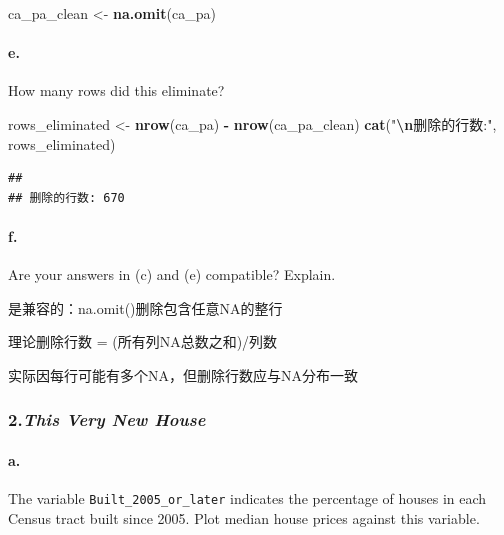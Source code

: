 \documentclass[
]{article}
\newenvironment{Shaded}{\begin{snugshade}}{\end{snugshade}}
\newcommand{\FunctionTok}[1]{\textcolor[rgb]{0.13,0.29,0.53}{\textbf{#1}}}
\newcommand{\NormalTok}[1]{#1}
\newcommand{\OtherTok}[1]{\textcolor[rgb]{0.56,0.35,0.01}{#1}}
\newcommand{\SpecialCharTok}[1]{\textcolor[rgb]{0.81,0.36,0.00}{\textbf{#1}}}
\newcommand{\StringTok}[1]{\textcolor[rgb]{0.31,0.60,0.02}{#1}}
\begin{document}
\begin{Shaded}
\begin{Highlighting}[]
\NormalTok{      ca\_pa\_clean }\OtherTok{\textless{}{-}} \FunctionTok{na.omit}\NormalTok{(ca\_pa)}
\end{Highlighting}
\end{Shaded}

\paragraph{e.}\label{e.}

How many rows did this eliminate?

\begin{Shaded}
\begin{Highlighting}[]
\NormalTok{rows\_eliminated }\OtherTok{\textless{}{-}} \FunctionTok{nrow}\NormalTok{(ca\_pa) }\SpecialCharTok{{-}} \FunctionTok{nrow}\NormalTok{(ca\_pa\_clean)}
\FunctionTok{cat}\NormalTok{(}\StringTok{"}\SpecialCharTok{\textbackslash{}n}\StringTok{删除的行数:"}\NormalTok{, rows\_eliminated)}
\end{Highlighting}
\end{Shaded}

\begin{verbatim}
## 
## 删除的行数: 670
\end{verbatim}

\paragraph{f.}\label{f.}

Are your answers in (c) and (e) compatible? Explain.

是兼容的：na.omit()删除包含任意NA的整行

理论删除行数 = (所有列NA总数之和)/列数

实际因每行可能有多个NA，但删除行数应与NA分布一致

\subsubsection{\texorpdfstring{2.\emph{This Very New
House}}{2.This Very New House}}\label{this-very-new-house}

\paragraph{a.}\label{a.-1}

The variable \texttt{Built\_2005\_or\_later} indicates the percentage of
houses in each Census tract built since 2005. Plot median house prices
against this variable.
\end{document}
